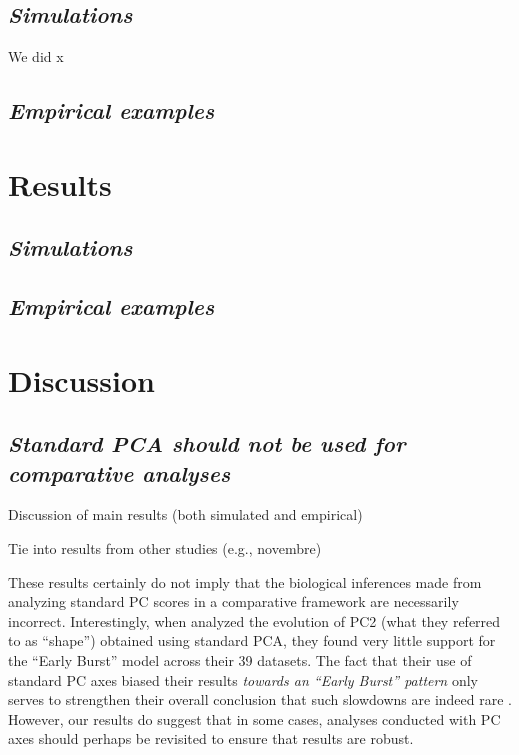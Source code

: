\documentclass[a4paper,12pt]{article}
\begin{document}
\subsection{\emph{Simulations}}

We did x

\subsection{\emph{Empirical examples}}

\section{Results}

\subsection{\emph{Simulations}}

\subsection{\emph{Empirical examples}}

\section{Discussion}
\subsection{\emph{Standard PCA should not be used for comparative analyses}} 

Discussion of main results (both simulated and empirical)

Tie into results from other studies (e.g., novembre)

These results certainly do not imply that the biological inferences made from analyzing standard PC scores in a comparative framework are necessarily incorrect.  
Interestingly, when \citet{Harmon2010} analyzed the evolution of PC2 (what they referred to as ``shape'') obtained using standard PCA, they found very little support for the ``Early Burst'' model \citep{Blomberg2003} across their 39 datasets. The fact that their use of standard PC axes biased their results \emph{towards an ``Early Burst'' pattern} only serves to strengthen their overall conclusion that such slowdowns are indeed rare \citep[but see][]{SlaterPennell}. However, our results do suggest that in some cases, analyses conducted with PC axes should perhaps be revisited to ensure that results are robust.
\end{document}
